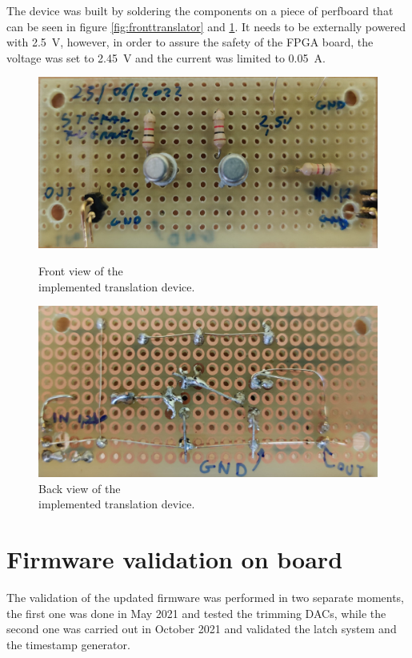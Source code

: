 \noindent The device was built by soldering the components on a piece of perfboard that can be seen in figure \ref{fig:fronttranslator} and \ref{fig:backtranslator}.
It needs to be externally powered with 2.5~V, however, in order to assure the safety of the FPGA board, the voltage was set to 2.45~V and the current was limited to 0.05~A. 
\begin{figure}[H]
	\centering
	\begin{minipage}{.5\textwidth}
		\centering
		\includegraphics[width=.99\linewidth]{IMG/ch5/FRONTTRANSLATOR}
		\caption{Front view of the \\implemented translation device.}
		\label{fig:fronttranslator}
	\end{minipage}%
	\begin{minipage}{.5\textwidth}
		\centering
		\includegraphics[width=.99\linewidth]{IMG/ch5/BACKTRANSLATOR}
		\caption{Back view of the \\implemented translation device.}
		\label{fig:backtranslator}
	\end{minipage}
\end{figure}

\section{Firmware validation on board}
The validation of the updated firmware was performed in two separate moments, the first one was done in May 2021 and tested the trimming DACs, while the second one was carried out in October 2021 and validated the latch system and the timestamp generator. 
